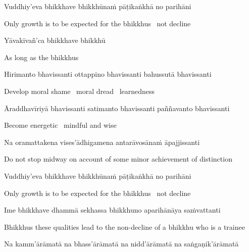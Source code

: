 Vuddhiy'eva bhikkhave bhikkhūnaṁ pāṭikaṅkhā no parihāni

\begin{english}
  Only growth is to be expected for the bhikkhus \breathmark\ not decline
\end{english}

Yāvakīvañ'ca bhikkhave bhikkhū

\begin{english}
  As long as the bhikkhus
\end{english}

Hirimanto bhavissanti ottappino bhavissanti bahussutā bhavissanti

\begin{english}
  Develop moral shame \breathmark\ moral dread \breathmark\ learnedness
\end{english}

\begin{pali-hang}
  Āraddhavīriyā bhavissanti satimanto bhavissanti paññavanto bhavissanti
\end{pali-hang}

\begin{english}
  Become energetic \breathmark\ mindful and wise
\end{english}

Na oramattakena vises'ādhigamena antarāvosānaṁ āpajjissanti

\begin{english-hang}
  Do not stop midway on account of some minor achievement of distinction
\end{english-hang}

Vuddhiy'eva bhikkhave bhikkhūnaṁ pāṭikaṅkhā no parihāni

\begin{english}
  Only growth is to be expected for the bhikkhus \breathmark\ not decline
\end{english}

\suttaRef{[AN 7.23-27]}

\begin{pali-hang}
  Ime bhikkhave dhammā sekhassa bhikkhuno aparihānāya saṁvattanti
\end{pali-hang}

\begin{english-hang}
  Bhikkhus these qualities lead to the non-decline of a bhikkhu who is a trainee
\end{english-hang}

\begin{pali-hang}
  Na kamm'ārāmatā na bhass'ārāmatā na nidd'ārāmatā na saṅgaṇik'ārāmatā
\end{pali-hang}

